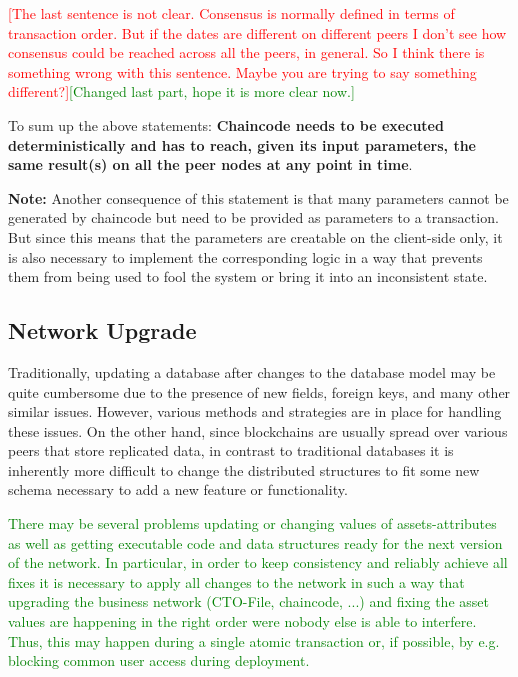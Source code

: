\textcolor{red}{[The last sentence is not clear. Consensus is normally defined in terms of transaction order. But if the dates are different on different peers I don't see how consensus could be reached across all the peers, in general. So I think there is something wrong with this sentence. Maybe you are trying to say something different?]}\textcolor{green}{[Changed last part, hope it is more clear now.]}

To sum up the above statements: \textbf{Chaincode needs to be executed deterministically and has to reach, given its input parameters, the same result(s) on all the peer nodes at any point in time}.

\textbf{Note:} Another consequence of this statement is that many parameters cannot be generated by chaincode but need to be provided as parameters to a transaction. But since this means that the parameters are creatable on the client-side only, it is also necessary to implement the corresponding logic in a way that prevents them from being used to fool the system or bring it into an inconsistent state.

\subsection{Network Upgrade}

Traditionally, updating a database after changes to the database model may be quite cumbersome due to the presence of new fields, foreign keys, and many other similar issues. However, various methods and strategies are in place for handling these issues.
On the other hand, since blockchains are usually spread over various peers that store replicated data, in contrast to traditional databases it is inherently more difficult to change the distributed structures to fit some new schema necessary to add a new feature or functionality.

\textcolor{green}{There may be several problems updating or changing values of assets-attributes as well as getting executable code and data structures ready for the next version of the network.  In particular, in order to keep consistency and reliably achieve all fixes it is necessary to apply all changes to the network in such a way that upgrading the business network (CTO-File, chaincode, ...) and fixing the asset values are happening in the right order were nobody else is able to interfere. Thus, this may happen during a single atomic transaction or, if possible, by e.g. blocking common user access during deployment.}

